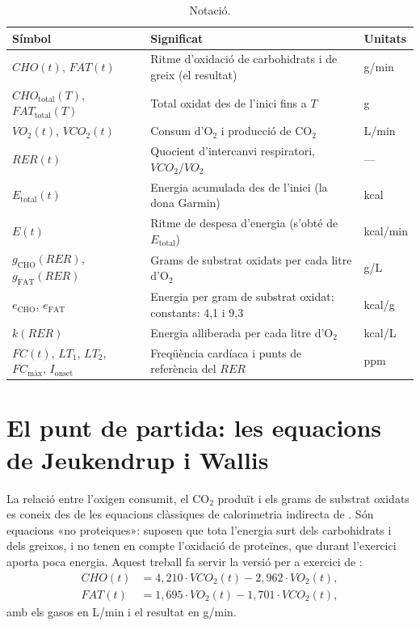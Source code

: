 \documentclass[10pt,a4paper]{article}
\newcommand{\sub}[1]{{\scriptscriptstyle\mathrm{#1}}}   %
\newcommand{\CHO}{\sub{CHO}}
\newcommand{\FAT}{\sub{FAT}}
\newcommand{\tot}{\sub{total}}
\newcommand{\smax}{{\scriptscriptstyle\text{màx}}}
\newcommand{\cho}{\ensuremath{\mathit{CHO}}}               %
\newcommand{\fat}{\ensuremath{\mathit{FAT}}}
\newcommand{\VO}{\ensuremath{\mathit{VO}_2}}               %
\newcommand{\VCO}{\ensuremath{\mathit{VCO}_2}}
\newcommand{\RER}{\ensuremath{\mathit{RER}}}
\newcommand{\FC}{\ensuremath{\mathit{FC}}}
\newcommand{\FCmax}{\ensuremath{\mathit{FC}_{\smax}}}
\newcommand{\Ion}{\ensuremath{I_{\mathrm{onset}}}}
\begin{document}
\begin{table}[H]
\centering
\caption{Notació.}
\label{tab:notacio}
\small
\begin{tabularx}{\textwidth}{@{}l L l@{}}
\toprule
Símbol & Significat & Unitats \\
\midrule
$\cho(t)$, $\fat(t)$ & Ritme d'oxidació de carbohidrats i de greix (el resultat) & g/min \\
$\cho_{\tot}(T)$, $\fat_{\tot}(T)$ & Total oxidat des de l'inici fins a $T$ & g \\
$\VO(t)$, $\VCO(t)$ & Consum d'O$_2$ i producció de CO$_2$ & L/min \\
$\RER(t)$ & Quocient d'intercanvi respiratori, $\VCO/\VO$ & --- \\
$E_{\tot}(t)$ & Energia acumulada des de l'inici (la dona Garmin) & kcal \\
$E(t)$ & Ritme de despesa d'energia (s'obté de $E_{\tot}$) & kcal/min \\
$g_{\CHO}(\RER)$, $g_{\FAT}(\RER)$ & Grams de substrat oxidats per cada litre d'O$_2$ & g/L \\
$e_{\CHO}$, $e_{\FAT}$ & Energia per gram de substrat oxidat; constants: 4,1 i 9,3 & kcal/g \\
$k(\RER)$ & Energia alliberada per cada litre d'O$_2$ & kcal/L \\
$\FC(t)$, $LT_1$, $LT_2$, $\FCmax$, $\Ion$ & Freqüència cardíaca i punts de referència del \RER & ppm \\
\bottomrule
\end{tabularx}
\end{table}

\section{El punt de partida: les equacions de Jeukendrup i Wallis}\label{sec:jw}

La relació entre l'oxigen consumit, el CO$_2$ produït i els grams de substrat oxidats es
coneix des de les equacions clàssiques de calorimetria indirecta de \citet{frayn1983}. Són
equacions «no proteiques»: suposen que tota l'energia surt dels carbohidrats i dels
greixos, i no tenen en compte l'oxidació de proteïnes, que durant l'exercici aporta poca
energia. Aquest treball fa servir la versió per a exercici de \citet{jeukendrup2005}:
\begin{align}
  \cho(t) &= 4{,}210\cdot\VCO(t)-2{,}962\cdot\VO(t), \label{eq:jw-cho}\\
  \fat(t) &= 1{,}695\cdot\VO(t)-1{,}701\cdot\VCO(t), \label{eq:jw-fat}
\end{align}
amb els gasos en L/min i el resultat en g/min.
\end{document}
